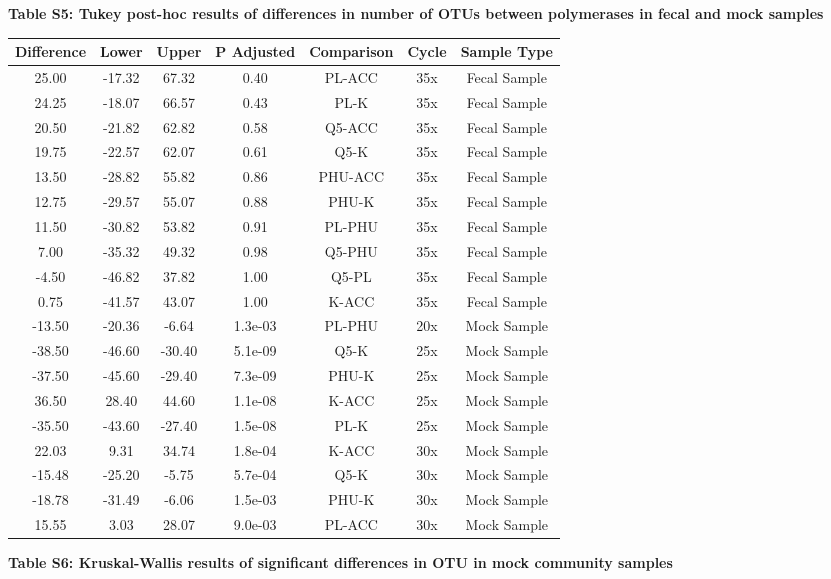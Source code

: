 \documentclass[11pt,]{article}
\begin{document}
\newpage

\textbf{Table S5: Tukey post-hoc results of differences in number of
OTUs between polymerases in fecal and mock samples}

\begin{longtable}[]{@{}ccccccc@{}}
\toprule
Difference & Lower & Upper & P Adjusted & Comparison & Cycle & Sample
Type\tabularnewline
\midrule
\endhead
25.00 & -17.32 & 67.32 & 0.40 & PL-ACC & 35x & Fecal
Sample\tabularnewline
24.25 & -18.07 & 66.57 & 0.43 & PL-K & 35x & Fecal Sample\tabularnewline
20.50 & -21.82 & 62.82 & 0.58 & Q5-ACC & 35x & Fecal
Sample\tabularnewline
19.75 & -22.57 & 62.07 & 0.61 & Q5-K & 35x & Fecal Sample\tabularnewline
13.50 & -28.82 & 55.82 & 0.86 & PHU-ACC & 35x & Fecal
Sample\tabularnewline
12.75 & -29.57 & 55.07 & 0.88 & PHU-K & 35x & Fecal
Sample\tabularnewline
11.50 & -30.82 & 53.82 & 0.91 & PL-PHU & 35x & Fecal
Sample\tabularnewline
7.00 & -35.32 & 49.32 & 0.98 & Q5-PHU & 35x & Fecal
Sample\tabularnewline
-4.50 & -46.82 & 37.82 & 1.00 & Q5-PL & 35x & Fecal
Sample\tabularnewline
0.75 & -41.57 & 43.07 & 1.00 & K-ACC & 35x & Fecal Sample\tabularnewline
-13.50 & -20.36 & -6.64 & 1.3e-03 & PL-PHU & 20x & Mock
Sample\tabularnewline
-38.50 & -46.60 & -30.40 & 5.1e-09 & Q5-K & 25x & Mock
Sample\tabularnewline
-37.50 & -45.60 & -29.40 & 7.3e-09 & PHU-K & 25x & Mock
Sample\tabularnewline
36.50 & 28.40 & 44.60 & 1.1e-08 & K-ACC & 25x & Mock
Sample\tabularnewline
-35.50 & -43.60 & -27.40 & 1.5e-08 & PL-K & 25x & Mock
Sample\tabularnewline
22.03 & 9.31 & 34.74 & 1.8e-04 & K-ACC & 30x & Mock
Sample\tabularnewline
-15.48 & -25.20 & -5.75 & 5.7e-04 & Q5-K & 30x & Mock
Sample\tabularnewline
-18.78 & -31.49 & -6.06 & 1.5e-03 & PHU-K & 30x & Mock
Sample\tabularnewline
15.55 & 3.03 & 28.07 & 9.0e-03 & PL-ACC & 30x & Mock
Sample\tabularnewline
\bottomrule
\end{longtable}

\newpage

\textbf{Table S6: Kruskal-Wallis results of significant differences in
OTU in mock community samples}
\end{document}

